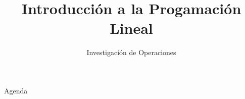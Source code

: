 \documentclass[../slides.tex]{subfiles}
\title{Introducción a la Progamación Lineal}
\subtitle{Investigación de Operaciones} %
\begin{document}
\begin{frame}
  \maketitle
\end{frame}


     \begin{frame}{Agenda}
   \tableofcontents
 \end{frame}





\begin{frame}
  \maketitle
\end{frame}
\end{document}
